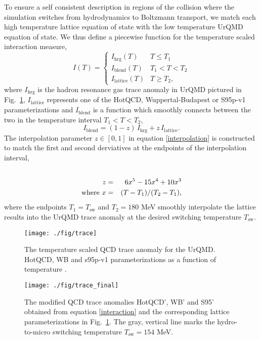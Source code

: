 \documentclass[aps,prc,reprint,amsmath,nofootinbib,superscriptaddress]{revtex4-1}
\begin{document}
To ensure a self consistent description in regions of the collision where the simulation switches from hydrodynamics to Boltzmann transport, we match each high 
temperature lattice equation of state with the low temperature UrQMD equation of state. We thus define a piecewise function for the temperature scaled interaction measure,
\begin{equation}
 \label{interaction}
 I(T) =
  \begin{cases}
   I_\text{hrg}(T)	& T \le T_1 \\
   I_\text{blend}(T)	& T_1 < T < T_2 \\ 
   I_\text{lattice}(T)	& T \ge T_2,
  \end{cases}
\end{equation}
where $I_\text{hrg}$ is the hadron resonance gas trace anomaly in UrQMD pictured in Fig.~\ref{fig:trace}, $I_\text{lattice}$ represents one of the HotQCD, Wuppertal-Budapest or S95p-v1 
parameterizations and $I_\text{blend}$ is a function which smoothly connects between the two in the temperature interval $T_1 < T < T_2$,
\begin{equation}
  \label{interpolation}
  I_\text{blend} = (1-z)\, I_\text{hrg} + z\, I_\text{lattice}.
\end{equation}
The interpolation parameter $z \in [0,1]$ in equation \ref{interpolation} is constructed to match the first and second derviatives at the endpoints of the 
interpolation interval,
\begin{eqnarray}
 \label{smoothstep}
 \cr z &=& 6 x^5 - 15 x^4 + 10 x^3 \\
  \text{where } x &=& (T - T_1)/(T_2 - T_1),
\end{eqnarray}
where the endpoints $T_1 = T_\text{sw}$ and $T_2 = 180$ MeV smoothly interpolate the lattice results into the UrQMD trace anomaly at the desired switching 
temperature $T_\text{sw}$.

\begin{figure}[t]
  \texttt{[image: ./fig/trace]}
  \caption{\label{fig:trace} The temperature scaled QCD trace anomaly for the UrQMD. HotQCD, WB and s95p-v1 parameterizations as a function of temperature \cite{?}.}
\end{figure}

\begin{figure}[b]
  \texttt{[image: ./fig/trace\_final]}
  \caption{\label{fig:trace_final} The modified QCD trace anomalies HotQCD', WB' and S95' obtained from equation \eqref{interaction} and the corresponding lattice
	  parameterizations in Fig.~\ref{fig:trace}. The gray, vertical line marks the hydro-to-micro switching temperature $T_\text{sw} = 154$ MeV.}
\end{figure}
\end{document}
